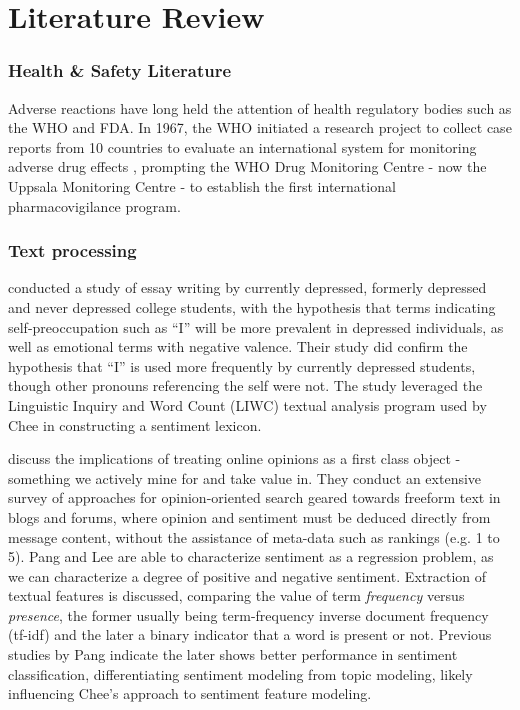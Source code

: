 \documentclass[twoside,11pt]{article}
\begin{document}
\section{Literature Review}

\subsubsection{Health & Safety Literature}
Adverse reactions have long held the attention of health regulatory bodies such as the WHO and FDA. In 1967, the WHO initiated a research project to collect case reports from 10 countries to evaluate an international system for monitoring adverse drug effects \citep{WHO}, prompting the WHO Drug Monitoring Centre - now the Uppsala Monitoring Centre - to establish the first international pharmacovigilance program.

\subsubsection{Text processing}
\citet{Rude} conducted a study of essay writing by currently depressed, formerly depressed and never depressed college students, with the hypothesis that terms indicating self-preoccupation such as ``I'' will be more prevalent in depressed individuals, as well as emotional terms with negative valence. Their study did confirm the hypothesis that ``I'' is used more frequently by currently depressed students, though other pronouns referencing the self were not. The study leveraged the Linguistic Inquiry and Word Count (LIWC) textual analysis program used by Chee in constructing a sentiment lexicon.

\citet{Pang} discuss the implications of treating online opinions as a first class object - something we actively mine for and take value in. They conduct an extensive survey of approaches for opinion-oriented search geared towards freeform text in blogs and forums, where opinion and sentiment must be deduced directly from message content, without the assistance of meta-data such as rankings (e.g.  1 to 5). Pang and Lee are able to characterize sentiment as a regression problem, as we can characterize a degree of positive and negative sentiment. Extraction of textual features is discussed, comparing the value of term \textit{frequency} versus \textit{presence}, the former usually being term-frequency inverse document frequency (tf-idf) and the later a binary indicator that a word is present or not. Previous studies by Pang indicate the later shows better performance in sentiment classification, differentiating sentiment modeling from topic modeling, likely influencing Chee's approach to sentiment feature modeling.
\end{document}
